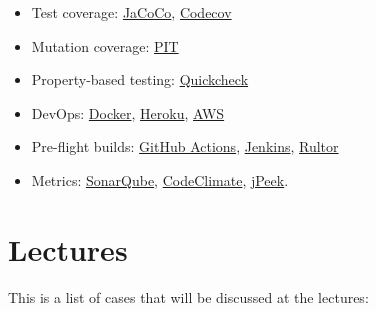 \documentclass[nobrand,anonymous,nodate,nosecurity]{huawei}
\begin{document}
{\begin{itemize}
\item Test coverage:
	\href{https://www.eclemma.org/jacoco/}{JaCoCo},
	\href{codecov.io/}{Codecov}
\item Mutation coverage:
	\href{https://www.pitest.org}{PIT}
\item Property-based testing:
	\href{https://en.wikipedia.org/wiki/QuickCheck}{Quickcheck}
\item DevOps:
	\href{https://www.docker.com}{Docker},
	\href{https://www.heroku.com}{Heroku},
	\href{https://aws.amazon.com/}{AWS}
\item Pre-flight builds:
	\href{https://github.com/features/actions}{GitHub Actions},
	\href{https://www.jenkins.io}{Jenkins},
	\href{https://www.rultor.com}{Rultor}
\item Metrics:
	\href{https://www.sonarqube.org}{SonarQube},
	\href{https://codeclimate.com/}{CodeClimate},
	\href{https://www.jpeek.org}{jPeek}.
\end{itemize}

\newpage
\section*{Lectures}

\newcommand\github[1]{\href{https://github.com/#1}{#1}}

This is a list of cases that will be discussed at the lectures:

}
\end{document}
